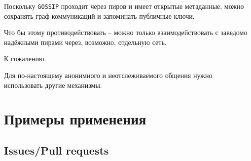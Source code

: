 \documentclass[11pt,a4paper]{article}
\begin{document}
Поскольку \texttt{GOSSIP} проходит через пиров и имеет открытые метаданные,
можно сохранять граф коммуникаций и запоминать публичные ключи.

Что бы этому противодействовать -- можно только взаимодействовать с заведомо
надёжными пирами через, возможно, отдельную сеть.

К сожалению.

Для по-настоящему анонимного и неотслеживаемого общения нужно использовать
другие механизмы.

\section{Примеры применения}

\subsection{Issues/Pull requests}
\end{document}

